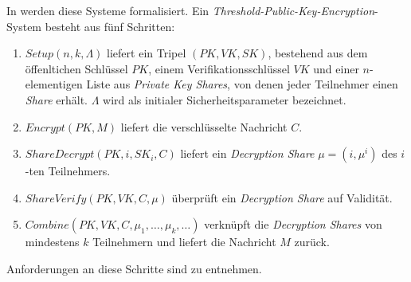 \documentclass[
    fontsize=12pt,
    headings=small,
    parskip=half,           %
    bibliography=totoc,
    numbers=noenddot,       %
    open=any,               %
    ]{scrreprt}
\begin{document}
In \cite{boneh2006} werden diese Systeme formalisiert. Ein \textit{Threshold-Public-Key-Encryption}-System besteht aus fünf Schritten:
\begin{enumerate}
	\item \(Setup(n,k,\Lambda)\) liefert ein Tripel \((PK, VK, SK)\), bestehend aus dem öffenltichen Schlüssel \(PK\), einem Verifikationsschlüssel \(VK\) und einer \(n\)-elementigen Liste aus \textit{Private Key Shares}, von denen jeder Teilnehmer einen \textit{Share} erhält. \(\Lambda\) wird als initialer Sicherheitsparameter bezeichnet.
	\item \(Encrypt(PK, M)\) liefert die verschlüsselte Nachricht \(C\).
	\item \(ShareDecrypt(PK, i, SK_i, C)\) liefert ein \textit{Decryption Share} \(\mu=(i, \mu^i)\) des \(i\)-ten Teilnehmers.
	\item \(ShareVerify(PK, VK, C, \mu)\) überprüft ein \textit{Decryption Share} auf Validität.
	\item \(Combine(PK, VK, C, {\mu_1, \dots,\mu_k, \dots})\) verknüpft die \textit{Decryption Shares} von mindestens \(k\) Teilnehmern und liefert die Nachricht \(M\) zurück.
\end{enumerate}
Anforderungen an diese Schritte sind \cite{boneh2006} zu entnehmen. 





\begin{raggedright}         %
  \printbibliography        %
  \label{sec:literaturverzeichnis}
\end{raggedright}
\end{document}
